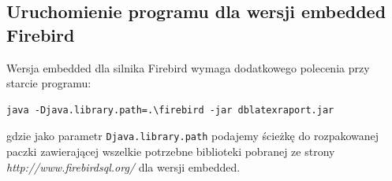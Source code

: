 \subsection{Uruchomienie programu dla wersji embedded Firebird}

Wersja embedded dla silnika Firebird wymaga dodatkowego polecenia przy starcie programu:
\begin{lstlisting}
java -Djava.library.path=.\firebird -jar dblatexraport.jar
\end{lstlisting}
gdzie jako parametr \texttt{Djava.library.path} podajemy ścieżkę do rozpakowanej paczki zawierającej wszelkie potrzebne biblioteki pobranej ze strony \emph{http://www.firebirdsql.org/} dla wersji embedded.